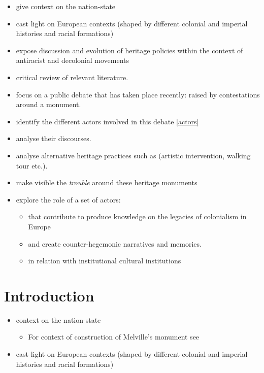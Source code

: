 \documentclass{scrartcl}
\begin{document}
\begin{itemize}    
    \item give context on the nation-state     
    \item cast light on European contexts (shaped by different colonial and imperial histories and racial formations)
    \item expose discussion and evolution of heritage policies within the context of antiracist and decolonial movements
    \item critical review of relevant literature.
    \item focus on a public debate that has taken place recently: raised by contestations around a monument. 
    \item identify the different actors involved in this debate \ref{actors}
    \item analyse their discourses. 
    \item analyse alternative heritage practices such as (artistic intervention, walking tour etc.).
    \item make visible the \textit{trouble} around these heritage monuments
    \item explore the role of a set of actors:
    \begin{itemize}
        \item that contribute to produce knowledge on the legacies of colonialism in Europe
        \item  and create counter-hegemonic narratives and memories.
        \item in relation with institutional cultural institutions        
    \end{itemize}
\end{itemize}

\section{Introduction}

\begin{itemize}
    \item context on the nation-state 
    \begin{itemize}
        \item For context of construction of Melville's monument see \cite{godard_2018}
    \end{itemize}
    \item cast light on European contexts (shaped by different colonial and imperial histories and racial formations)
\end{itemize}
\end{document}
